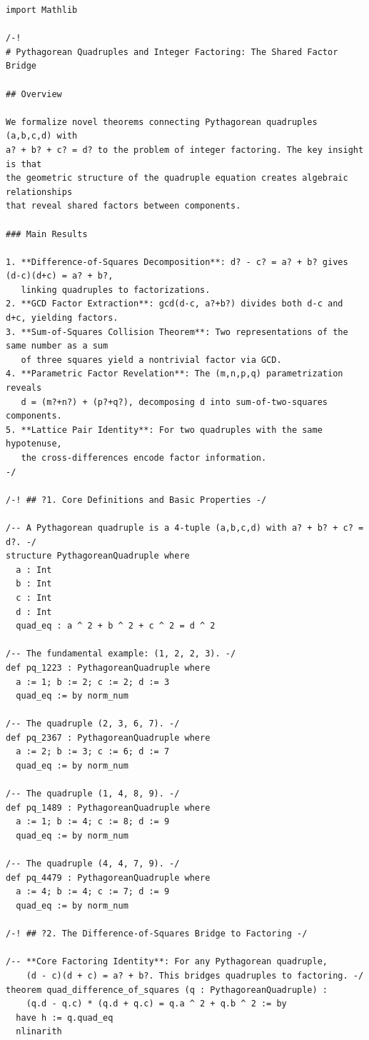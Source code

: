 \documentclass[11pt,twoside,openright]{book}
\theoremstyle{definition}
\theoremstyle{remark}
\begin{document}
\begin{lstlisting}[style=lean]
import Mathlib

/-!
# Pythagorean Quadruples and Integer Factoring: The Shared Factor Bridge

## Overview

We formalize novel theorems connecting Pythagorean quadruples (a,b,c,d) with
a? + b? + c? = d? to the problem of integer factoring. The key insight is that
the geometric structure of the quadruple equation creates algebraic relationships
that reveal shared factors between components.

### Main Results

1. **Difference-of-Squares Decomposition**: d? - c? = a? + b? gives (d-c)(d+c) = a? + b?,
   linking quadruples to factorizations.
2. **GCD Factor Extraction**: gcd(d-c, a?+b?) divides both d-c and d+c, yielding factors.
3. **Sum-of-Squares Collision Theorem**: Two representations of the same number as a sum
   of three squares yield a nontrivial factor via GCD.
4. **Parametric Factor Revelation**: The (m,n,p,q) parametrization reveals
   d = (m?+n?) + (p?+q?), decomposing d into sum-of-two-squares components.
5. **Lattice Pair Identity**: For two quadruples with the same hypotenuse,
   the cross-differences encode factor information.
-/

/-! ## ?1. Core Definitions and Basic Properties -/

/-- A Pythagorean quadruple is a 4-tuple (a,b,c,d) with a? + b? + c? = d?. -/
structure PythagoreanQuadruple where
  a : Int
  b : Int
  c : Int
  d : Int
  quad_eq : a ^ 2 + b ^ 2 + c ^ 2 = d ^ 2

/-- The fundamental example: (1, 2, 2, 3). -/
def pq_1223 : PythagoreanQuadruple where
  a := 1; b := 2; c := 2; d := 3
  quad_eq := by norm_num

/-- The quadruple (2, 3, 6, 7). -/
def pq_2367 : PythagoreanQuadruple where
  a := 2; b := 3; c := 6; d := 7
  quad_eq := by norm_num

/-- The quadruple (1, 4, 8, 9). -/
def pq_1489 : PythagoreanQuadruple where
  a := 1; b := 4; c := 8; d := 9
  quad_eq := by norm_num

/-- The quadruple (4, 4, 7, 9). -/
def pq_4479 : PythagoreanQuadruple where
  a := 4; b := 4; c := 7; d := 9
  quad_eq := by norm_num

/-! ## ?2. The Difference-of-Squares Bridge to Factoring -/

/-- **Core Factoring Identity**: For any Pythagorean quadruple,
    (d - c)(d + c) = a? + b?. This bridges quadruples to factoring. -/
theorem quad_difference_of_squares (q : PythagoreanQuadruple) :
    (q.d - q.c) * (q.d + q.c) = q.a ^ 2 + q.b ^ 2 := by
  have h := q.quad_eq
  nlinarith


\end{lstlisting}
\end{document}
